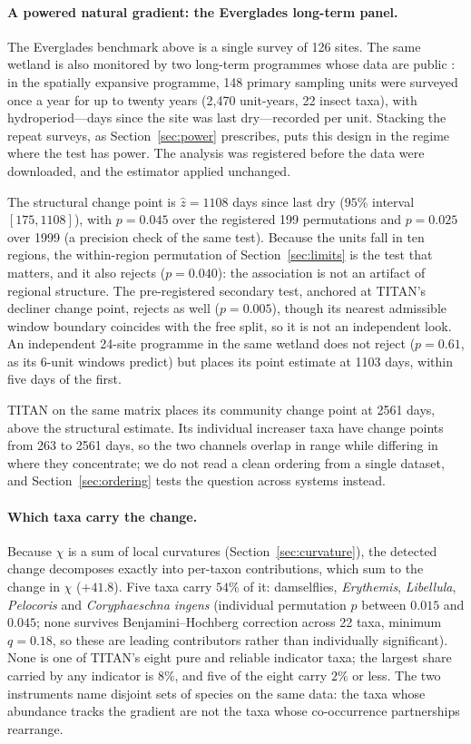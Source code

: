 \documentclass[review,12pt,authoryear]{elsarticle}
\theoremstyle{remark}
\begin{document}
\paragraph{A powered natural gradient: the Everglades long-term panel.}
The Everglades benchmark above is a single survey of 126 sites. The same
wetland is also monitored by two long-term programmes whose data are public
\citep{pintar2026everglades}: in the spatially expansive programme, 148
primary sampling units were surveyed once a year for up to twenty years
(2,470 unit-years, 22 insect taxa), with hydroperiod---days since the site
was last dry---recorded per unit. Stacking the repeat surveys, as
Section~\ref{sec:power} prescribes, puts this design in the regime where
the test has power. The analysis was registered before the data were
downloaded, and the estimator applied unchanged.

The structural change point is $\hat z = 1108$ days since last dry
($95\%$ interval $[175, 1108]$), with $p = 0.045$ over the registered 199
permutations and $p = 0.025$ over 1999 (a precision check of the same
test). Because the units fall in ten regions, the within-region permutation
of Section~\ref{sec:limits} is the test that matters, and it also rejects
($p = 0.040$): the association is not an artifact of regional structure.
The pre-registered secondary test, anchored at TITAN's decliner change
point, rejects as well ($p = 0.005$), though its nearest admissible window
boundary coincides with the free split, so it is not an independent look.
An independent 24-site programme in the same wetland does not reject
($p = 0.61$, as its 6-unit windows predict) but places its point estimate
at 1103 days, within five days of the first.

TITAN on the same matrix places its community change point at 2561 days,
above the structural estimate. Its individual increaser taxa have change
points from 263 to 2561 days, so the two channels overlap in range while
differing in where they concentrate; we do not read a clean ordering from a
single dataset, and Section~\ref{sec:ordering} tests the question across
systems instead.

\paragraph{Which taxa carry the change.} Because $\chi$ is a sum of local
curvatures (Section~\ref{sec:curvature}), the detected change decomposes
exactly into per-taxon contributions, which sum to the change in $\chi$
($+41.8$). Five taxa carry $54\%$ of it: damselflies, \emph{Erythemis},
\emph{Libellula}, \emph{Pelocoris} and \emph{Coryphaeschna ingens}
(individual permutation $p$ between $0.015$ and $0.045$; none survives
Benjamini--Hochberg correction across 22 taxa, minimum $q = 0.18$, so these
are leading contributors rather than individually significant). None is one
of TITAN's eight pure and reliable indicator taxa; the largest share carried
by any indicator is $8\%$, and five of the eight carry $2\%$ or less. The two
instruments name disjoint sets of species on the same data: the taxa whose
abundance tracks the gradient are not the taxa whose co-occurrence
partnerships rearrange.
\end{document}
